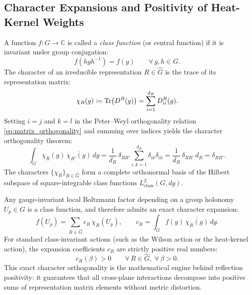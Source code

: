 \subsection{Character Expansions and Positivity of Heat-Kernel Weights}
\label{subsec:character_expansions}
A function $f : G \to \mathbb{C}$ is called a \emph{class function} (or central function) if it is invariant under group conjugation:
\begin{equation}
f(h g h^{-1}) = f(g) \qquad \forall \, g, h \in G.
\end{equation}
The character of an irreducible representation $R \in \widehat{G}$ is the trace of its representation matrix:
\begin{equation}
\chi_R(g) \coloneqq \mathrm{Tr}\bigl( D^R(g) \bigr) = \sum_{i=1}^{d_R} D^R_{ii}(g).
\end{equation}
Setting $i = j$ and $k = l$ in the Peter--Weyl orthogonality relation \eqref{eq:matrix_orthogonality} and summing over indices yields the character orthogonality theorem:
\begin{equation}
\label{eq:character_orthogonality_detailed}
\int_G \chi_R(g) \, \overline{\chi_{R'}(g)} \, dg = \frac{1}{d_R} \, \delta_{RR'} \sum_{i, k=1}^{d_R} \delta_{ik} \delta_{ik} = \frac{1}{d_R} \, \delta_{RR'} \, d_R = \delta_{RR'}.
\end{equation}
The characters $\{\chi_R\}_{R \in \widehat{G}}$ form a complete orthonormal basis of the Hilbert subspace of square-integrable class functions $L^2_{\mathrm{class}}(G, dg)$.

Any gauge-invariant local Boltzmann factor depending on a group holonomy $U_p \in G$ is a class function, and therefore admits an exact character expansion:
\begin{equation}
\label{eq:character_expansion_general}
f(U_p) = \sum_{R \in \widehat{G}} c_R \, \chi_R(U_p), \qquad c_R = \int_G f(g) \, \overline{\chi_R(g)} \, dg.
\end{equation}
For standard class-invariant actions (such as the Wilson action or the heat-kernel action), the expansion coefficients $c_R$ are strictly positive real numbers:
\begin{equation}
c_R(\beta) > 0 \qquad \forall \, R \in \widehat{G}, \; \forall \, \beta > 0.
\end{equation}
This exact character orthogonality is the mathematical engine behind reflection positivity: it guarantees that all cross-plane interactions decompose into positive sums of representation matrix elements without metric distortion.



